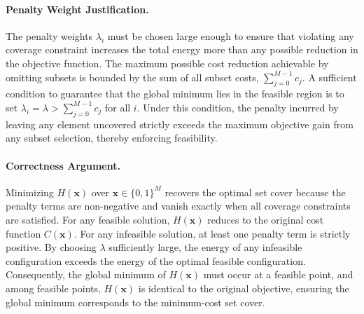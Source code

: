 \documentclass[12pt]{article}
\begin{document}
\paragraph{Penalty Weight Justification.}
The penalty weights $\lambda_i$ must be chosen large enough to ensure that violating any coverage constraint increases the total energy more than any possible reduction in the objective function. The maximum possible cost reduction achievable by omitting subsets is bounded by the sum of all subset costs, $\sum_{j=0}^{M-1} c_j$. A sufficient condition to guarantee that the global minimum lies in the feasible region is to set $\lambda_i = \lambda > \sum_{j=0}^{M-1} c_j$ for all $i$. Under this condition, the penalty incurred by leaving any element uncovered strictly exceeds the maximum objective gain from any subset selection, thereby enforcing feasibility.

\paragraph{Correctness Argument.}
Minimizing $H(\mathbf{x})$ over $\mathbf{x} \in \{0,1\}^M$ recovers the optimal set cover because the penalty terms are non-negative and vanish exactly when all coverage constraints are satisfied. For any feasible solution, $H(\mathbf{x})$ reduces to the original cost function $C(\mathbf{x})$. For any infeasible solution, at least one penalty term is strictly positive. By choosing $\lambda$ sufficiently large, the energy of any infeasible configuration exceeds the energy of the optimal feasible configuration. Consequently, the global minimum of $H(\mathbf{x})$ must occur at a feasible point, and among feasible points, $H(\mathbf{x})$ is identical to the original objective, ensuring the global minimum corresponds to the minimum-cost set cover.
\end{document}
